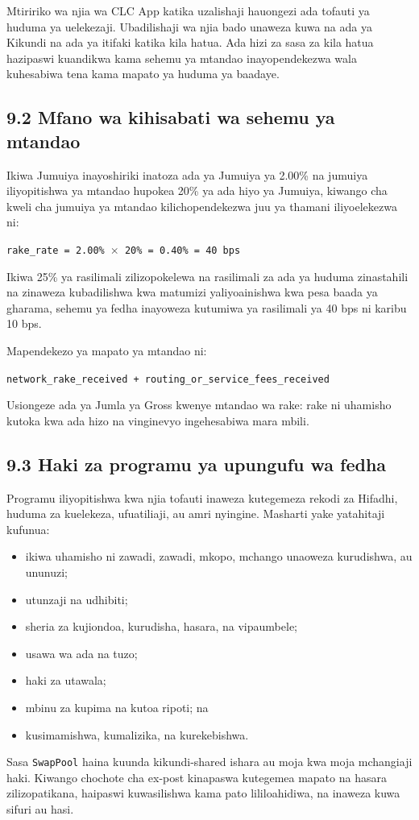 \documentclass[11pt]{article}
\begin{document}
Mtiririko wa njia wa CLC App katika uzalishaji hauongezi ada tofauti ya huduma ya uelekezaji. Ubadilishaji wa njia bado unaweza kuwa na ada ya Kikundi na ada ya itifaki katika kila hatua. Ada hizi za sasa za kila hatua hazipaswi kuandikwa kama sehemu ya mtandao inayopendekezwa wala kuhesabiwa tena kama mapato ya huduma ya baadaye.

\subsection*{9.2 Mfano wa kihisabati wa sehemu ya mtandao}

Ikiwa Jumuiya inayoshiriki inatoza ada ya Jumuiya ya 2.00\% na jumuiya iliyopitishwa ya mtandao hupokea 20\% ya ada hiyo ya Jumuiya, kiwango cha kweli cha jumuiya ya mtandao kilichopendekezwa juu ya thamani iliyoelekezwa ni:

\texttt{rake\_rate = 2.00\% $\times$ 20\% = 0.40\% = 40 bps}

Ikiwa 25\% ya rasilimali zilizopokelewa na rasilimali za ada ya huduma zinastahili na zinaweza kubadilishwa kwa matumizi yaliyoainishwa kwa pesa baada ya gharama, sehemu ya fedha inayoweza kutumiwa ya rasilimali ya 40 bps ni karibu 10 bps.

Mapendekezo ya mapato ya mtandao ni:

\texttt{network\_rake\_received + routing\_or\_service\_fees\_received}

Usiongeze ada ya Jumla ya Gross kwenye mtandao wa rake: rake ni uhamisho kutoka kwa ada hizo na vinginevyo ingehesabiwa mara mbili.

\subsection*{9.3 Haki za programu ya upungufu wa fedha}

Programu iliyopitishwa kwa njia tofauti inaweza kutegemeza rekodi za Hifadhi, huduma za kuelekeza, ufuatiliaji, au amri nyingine. Masharti yake yatahitaji kufunua:

\begin{itemize}[leftmargin=*]
\item ikiwa uhamisho ni zawadi, zawadi, mkopo, mchango unaoweza kurudishwa, au ununuzi;
\item utunzaji na udhibiti;
\item sheria za kujiondoa, kurudisha, hasara, na vipaumbele;
\item usawa wa ada na tuzo;
\item haki za utawala;
\item mbinu za kupima na kutoa ripoti; na
\item kusimamishwa, kumalizika, na kurekebishwa.
\end{itemize}
Sasa \texttt{SwapPool} haina kuunda kikundi-shared ishara au moja kwa moja mchangiaji haki. Kiwango chochote cha ex-post kinapaswa kutegemea mapato na hasara zilizopatikana, haipaswi kuwasilishwa kama pato lililoahidiwa, na inaweza kuwa sifuri au hasi.
\end{document}

